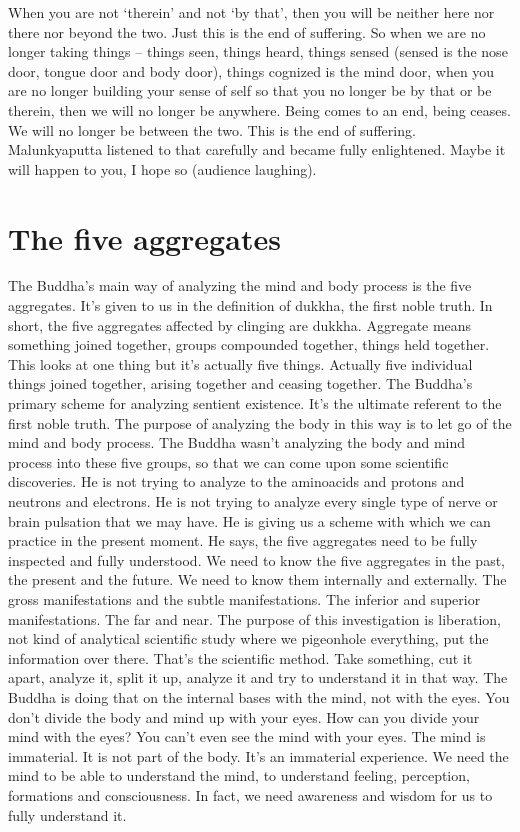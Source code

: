 \documentclass[letterpaper,10pt,english]{sphinxmanual}
\begin{document}
\sphinxAtStartPar
When you are not ‘therein’ and not ‘by that’, then you will be neither
here nor there nor beyond the two. Just this is the end of suffering. So when
we  are  no  longer  taking  things  –  things  seen,  things  heard,  things  sensed
(sensed is the nose door, tongue door and body door), things cognized is the
mind door, when you are no longer building your sense of self so that you no
longer be by that or be therein, then we will no longer be anywhere. Being
comes to an end, being ceases. We will no longer be between the two. This
is the end of suffering. Malunkyaputta listened to that carefully and became
fully enlightened. Maybe it will happen to you, I hope so (audience laughing).


\section{The five aggregates}
\label{\detokenize{5-b:the-five-aggregates}}
\sphinxAtStartPar
The  Buddha’s  main  way  of  analyzing  the  mind  and  body  process  is
the  five  aggregates.  It’s  given  to  us  in  the  definition  of  dukkha,  the  first
noble  truth.  In  short,  the  five  aggregates  affected  by  clinging  are  dukkha.
Aggregate means something joined together, groups compounded together,
things  held  together.  This  looks  at  one  thing  but  it’s  actually  five  things.
Actually five individual things joined together, arising together and ceasing
together.  The  Buddha’s  primary  scheme  for  analyzing  sentient  existence.
It’s the ultimate referent to the first noble truth. The purpose of analyzing
the body in this way is to let go of the mind and body process. The Buddha
wasn’t analyzing the body and mind process into these five groups, so that
we can come upon some scientific discoveries. He is not trying to analyze
to the amino\sphinxhyphen{}acids and protons and neutrons and electrons. He is not trying
to analyze every single type of nerve or brain pulsation that we may have.
He is giving us a scheme with which we can practice in the present moment.
He says, the five aggregates need to be fully inspected and fully understood.
We need to know the five aggregates in the past, the present and the future.
We need to know them internally and externally. The gross manifestations
and the subtle manifestations. The inferior and superior manifestations. The
far and near. The purpose of this investigation is liberation, not kind of analytical scientific study where we pigeonhole everything, put the information
  over there. That’s the scientific method. Take something, cut it apart, analyze
it, split it up, analyze it and try to understand it in that way. The Buddha is
doing that on the internal bases with the mind, not with the eyes. You don’t
divide the body and mind up with your eyes. How can you divide your mind
with  the  eyes? You  can’t  even  see  the  mind  with  your  eyes.  The  mind  is
immaterial. It is not part of the body. It’s an immaterial experience. We need
the mind to be able to understand the mind, to understand feeling, perception, formations and consciousness. In fact, we need awareness and wisdom
for us to fully understand it.
\end{document}
